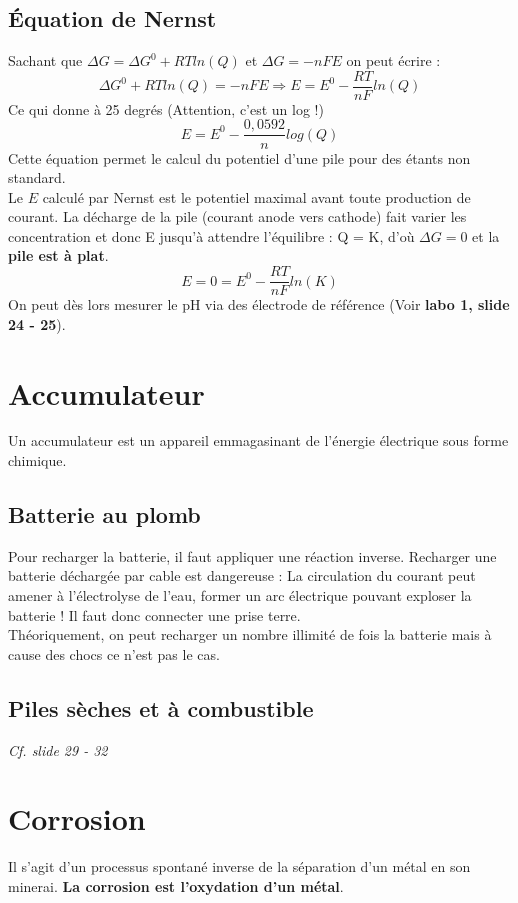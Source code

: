 \documentclass[british,french,11pt, a4paper, openany]{book}
\begin{document}
\subsection*{Équation de Nernst}
Sachant que $\Delta G = \Delta G^0 + RTln(Q)$ et $\Delta G = -nFE$ on peut écrire : 
$$\Delta G^0 + RTln(Q) = -nFE \Rightarrow E = E^0 - \frac{RT}{nF}ln(Q)$$
Ce qui donne à 25 degrés (Attention, c'est un log !)
$$E = E^0 - \frac{0,0592}{n}log(Q)$$
Cette équation permet le calcul du potentiel d'une pile pour des étants non standard.\\

Le $E$ calculé par Nernst est le potentiel maximal avant toute production de courant. La décharge de la pile (courant anode vers cathode) fait varier les concentration et donc E jusqu'à attendre l'équilibre : Q = K, d'où $\Delta G = 0$ et la \textbf{pile est à plat}.
$$E = 0 = E^0 - \frac{RT}{nF}ln(K)$$
On peut dès lors mesurer le pH via des électrode de référence (Voir \textbf{labo 1, slide 24 - 25}).

\section{Accumulateur}
Un accumulateur est un appareil emmagasinant de l'énergie électrique sous forme chimique.
\subsection*{Batterie au plomb}
Pour recharger la batterie, il faut appliquer une réaction inverse. Recharger une batterie déchargée par cable est dangereuse : La circulation du courant peut amener à l'électrolyse de l'eau, former un arc électrique pouvant exploser la batterie ! Il faut donc connecter une prise terre.\\
Théoriquement, on peut recharger un nombre illimité de fois la batterie mais à cause des chocs ce n'est pas le cas.

\subsection*{Piles sèches et à combustible}
\textit{Cf. slide 29 - 32}

\section{Corrosion}
Il s'agit d'un processus spontané inverse de la séparation d'un métal en son minerai. \textbf{La corrosion est l'oxydation d'un métal}.
\end{document}
